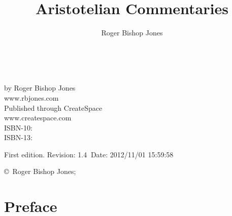 \newcommand{\indexentry}[2]{\item #1 #2}

\newcommand{\ignore}[1]{}

\title{Aristotelian Commentaries}
\author{Roger Bishop Jones}
\date{\ }




\frontmatter

\begin{titlepage}
\maketitle

\hspace{2in}

\vfill

\begin{centering}

\vfill

\vspace{0.1in}
by Roger Bishop Jones\\
www.rbjones.com\\
\vspace{0.2in}
Published through CreateSpace\\
www.createspace.com\\
\vspace{0.2in}
ISBN-10: \\
ISBN-13: \\
\vspace{0.2in}

{\footnotesize

First edition. $ $Revision: 1.4 $~$Date: 2012/11/01 15:59:58 $ $

\copyright\ Roger Bishop Jones;

}%

\end{centering}

\thispagestyle{empty}
\end{titlepage}

{\parskip=0pt\tableofcontents}

\vfill

\pagebreak

\chapter*{Preface}

